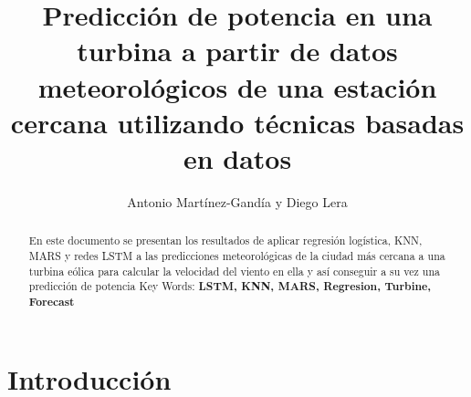 \documentclass[9pt, technote]{IEEEtran}
\title{Predicción de potencia en una turbina a partir de datos meteorológicos de una estación cercana utilizando técnicas basadas en datos}
\author{Antonio Martínez-Gandía y Diego Lera}
\begin{document}
\maketitle


\begin{abstract}
\begin{flushleft}
En este documento se presentan los resultados de aplicar regresión logística, KNN, MARS y redes LSTM a las predicciones meteorológicas de la ciudad más cercana a una turbina eólica para calcular la velocidad del viento en ella y así conseguir a su vez una predicción de potencia
Key Words: \textbf{LSTM, KNN, MARS, Regresion, Turbine, Forecast}
\end{flushleft}
\end{abstract}


\section*{Introducción}
\end{document}
